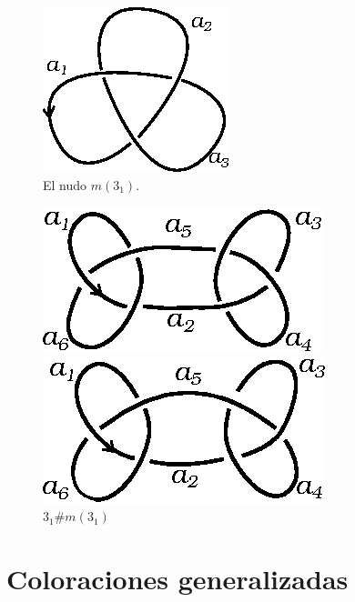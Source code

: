 \documentclass[graybox]{svmult}
\begin{document}
	\begin{figure}[ht]
			\centering
			\includegraphics[scale=0.6]{images/3_1m}
			\caption{El nudo $m(3_1)$.}
			\label{fig:3_1m}
		\end{figure}
	\begin{figure}[ht]
		\begin{minipage}{0.5\textwidth}
			\centering
			\includegraphics[scale=0.6]{images/granny}
			\caption{$3_1\#3_1$}
			\label{fig:granny}
		\end{minipage}
		\begin{minipage}{0.5\textwidth}
			\centering
			\includegraphics[scale=0.6]{images/square}
			\caption{$3_1\#m(3_1)$}
			\label{fig:square}
		\end{minipage}
	\end{figure}


 
\section{Coloraciones generalizadas}
\label{section:coloreos_generalizados}
\end{document}
